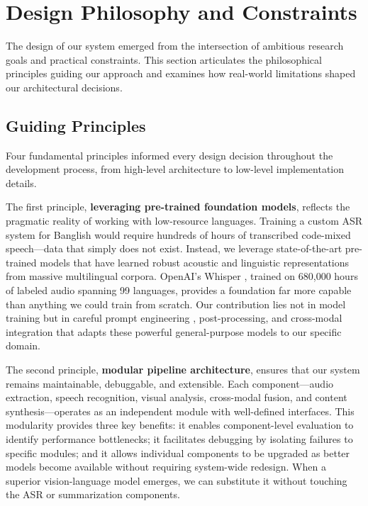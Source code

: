 \section{Design Philosophy and Constraints}

The design of our system emerged from the intersection of ambitious research goals and practical constraints. This section articulates the philosophical principles guiding our approach and examines how real-world limitations shaped our architectural decisions.

\subsection{Guiding Principles}

Four fundamental principles informed every design decision throughout the development process, from high-level architecture to low-level implementation details.

The first principle, \textbf{leveraging pre-trained foundation models}, reflects the pragmatic reality of working with low-resource languages. Training a custom ASR system for Banglish would require hundreds of hours of transcribed code-mixed speech---data that simply does not exist. Instead, we leverage state-of-the-art pre-trained models that have learned robust acoustic and linguistic representations from massive multilingual corpora. OpenAI's Whisper \cite{Radford2023}, trained on 680,000 hours of labeled audio spanning 99 languages, provides a foundation far more capable than anything we could train from scratch. Our contribution lies not in model training but in careful prompt engineering \cite{Liu2023Prompt}, post-processing, and cross-modal integration that adapts these powerful general-purpose models to our specific domain.

The second principle, \textbf{modular pipeline architecture}, ensures that our system remains maintainable, debuggable, and extensible. Each component---audio extraction, speech recognition, visual analysis, cross-modal fusion, and content synthesis---operates as an independent module with well-defined interfaces. This modularity provides three key benefits: it enables component-level evaluation to identify performance bottlenecks; it facilitates debugging by isolating failures to specific modules; and it allows individual components to be upgraded as better models become available without requiring system-wide redesign. When a superior vision-language model emerges, we can substitute it without touching the ASR or summarization components.

